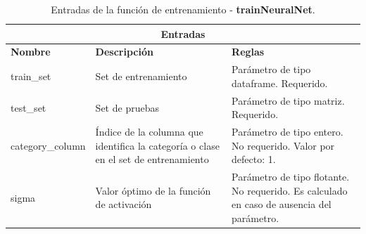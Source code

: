 \begin{table}[htb]
\begin{center}
\begin{tabular}{|p{3cm}|p{5cm}|p{8cm}|}
\hline
\multicolumn{3}{|c|}{\textbf{Entradas}} \\
\hline
\textbf{Nombre} & \textbf{Descripción} & \textbf{Reglas} \\
\hline \hline
train\_set & Set de entrenamiento & Parámetro de tipo dataframe. Requerido. \\ \hline
test\_set & Set de pruebas & Parámetro de tipo matriz. Requerido. \\ \hline
category\_column & Índice de la columna que identifica la categoría o clase en el set de entrenamiento & Parámetro de tipo entero. No requerido. Valor por defecto: 1. \\ \hline
sigma & Valor óptimo de la función de activación & Parámetro de tipo flotante. No requerido. Es calculado en caso de ausencia del parámetro. \\ \hline
\end{tabular}
\caption{Entradas de la función de entrenamiento - \textbf{trainNeuralNet}.}
\label{tabla:entradasTrainNeuralNet}
\end{center}
\end{table}

